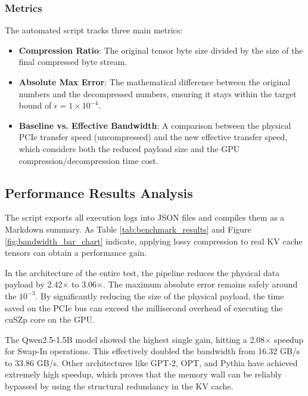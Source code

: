 \documentclass{polyu-comp}
\begin{document}
\subsubsection{Metrics}
The automated script tracks three main metrics:
\begin{itemize}
    \item \textbf{Compression Ratio}: The original tensor byte size divided by the size of the final compressed byte stream.
    \item \textbf{Absolute Max Error}: The mathematical difference between the original numbers and the decompressed numbers, ensuring it stays within the target bound of $\epsilon = 1 \times 10^{-4}$.
    \item \textbf{Baseline vs. Effective Bandwidth}: A comparison between the physical PCIe transfer speed (uncompressed) and the new effective transfer speed, which considers both the reduced payload size and the GPU compression/decompression time cost.
\end{itemize}

\subsection{Performance Results Analysis}
The script exports all execution logs into JSON files and compiles them as a Markdown summary. As Table \ref{tab:benchmark_results} and Figure \ref{fig:bandwidth_bar_chart} indicate, applying lossy compression to real KV cache tensors can obtain a performance gain.

In the architecture of the entire test, the pipeline reduces the physical data payload by 2.42$\times$ to 3.06$\times$. The maximum absolute error remains safely around the $10^{-3}$. By significantly reducing the size of the physical payload, the time saved on the PCIe bus can exceed the millisecond overhead of executing the cuSZp core on the GPU.

The Qwen2.5-1.5B model showed the highest single gain, hitting a 2.08$\times$ speedup for Swap-In operations. This effectively doubled the bandwidth from 16.32 GB/s to 33.86 GB/s. Other architectures like GPT-2, OPT, and Pythia have achieved extremely high speedup, which proves that the memory wall can be reliably bypassed by using the structural redundancy in the KV cache.
\end{document}
